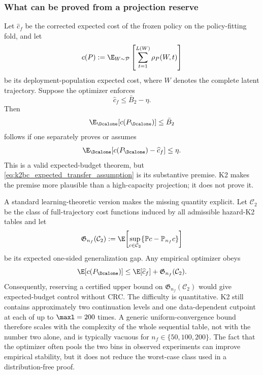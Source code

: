 \subsubsection{What can be proved from a projection reserve}

Let $\widehat c_f$ be the corrected expected cost of the frozen policy on the
policy-fitting fold, and let
\begin{equation}
    c(P):=\E_{W\sim\mathcal P}
       \left[\sum_{t=1}^{L(W)}\rho_P(W,t)\right]
\end{equation}
be its deployment-population expected cost, where $W$ denotes the complete
latent trajectory.  Suppose the optimizer enforces
\begin{equation}
    \widehat c_f\leq\bar B_2-\eta.
\end{equation}
Then
\begin{equation}
    \E_{\Dcalone}[c(P_{\Dcalone})]
    \leq\bar B_2
\end{equation}
follows if one separately proves or assumes
\begin{equation}
    \E_{\Dcalone}
      [c(P_{\Dcalone})-\widehat c_f]
    \leq\eta.
    \label{eq:k2bc_expected_transfer_assumption}
\end{equation}
This is a valid expected-budget theorem, but
\eqref{eq:k2bc_expected_transfer_assumption} is its substantive premise.
K2 makes the premise more plausible than a high-capacity projection; it does
not prove it.

A standard learning-theoretic version makes the missing quantity explicit.
Let $\mathcal C_2$ be the class of full-trajectory cost functions induced by
all admissible hazard-K2 tables and let
\begin{equation}
    \mathfrak G_{n_f}(\mathcal C_2)
    :=\E\!\left[
      \sup_{c\in\mathcal C_2}
      \{\mathbb Pc-\mathbb P_{n_f}c\}
    \right]
\end{equation}
be its expected one-sided generalization gap.  Any empirical optimizer obeys
\begin{equation}
    \E[c(P_{\Dcalone})]
    \leq \E[\widehat c_f]
       +\mathfrak G_{n_f}(\mathcal C_2).
    \label{eq:k2bc_uniform_gap}
\end{equation}
Consequently, reserving a certified upper bound on
$\mathfrak G_{n_f}(\mathcal C_2)$ would give expected-budget control without
CRC.  The difficulty is quantitative.  K2 still contains approximately two
continuation levels and one data-dependent cutpoint at each of up to
$\maxl=200$ times.  A generic uniform-convergence bound therefore scales with
the complexity of the whole sequential table, not with the number two alone,
and is typically vacuous for $n_f\in\{50,100,200\}$.  The fact that the
optimizer often pools the two bins in observed experiments can improve
empirical stability, but it does not reduce the worst-case class used in a
distribution-free proof.

